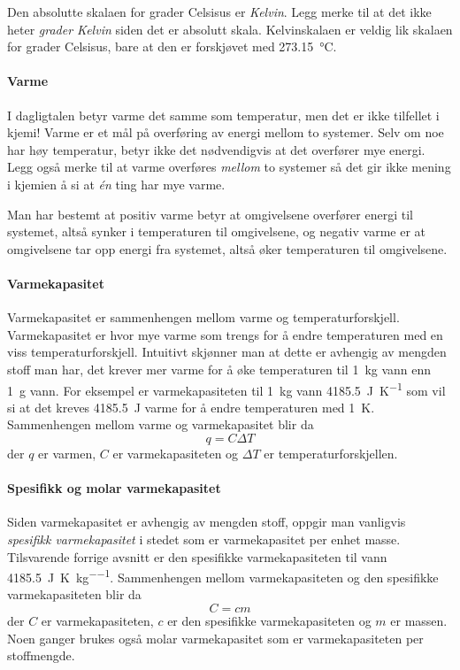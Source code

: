 	Den absolutte skalaen for grader Celsisus er \emph{Kelvin}.
	Legg merke til at det ikke heter \emph{grader Kelvin} siden det er absolutt skala.
	Kelvinskalaen er veldig lik skalaen for grader Celsisus, bare at den er forskjøvet med \SI{273.15}{\degreeCelsius}.
	
	\paragraph{Varme}
	I dagligtalen betyr varme det samme som temperatur, men det er ikke tilfellet i kjemi! Varme er et mål på overføring av energi mellom to systemer.
	Selv om noe har høy temperatur, betyr ikke det nødvendigvis at det overfører mye energi.
	Legg også merke til at varme overføres \emph{mellom} to systemer så det gir ikke mening i kjemien å si at \emph{én} ting har mye varme.
	
	Man har bestemt at positiv varme betyr at omgivelsene overfører energi til systemet, altså synker i temperaturen til omgivelsene, og negativ varme er at omgivelsene tar opp energi fra systemet, altså øker temperaturen til omgivelsene.
	
	\paragraph{Varmekapasitet}
	Varmekapasitet er sammenhengen mellom varme og temperaturforskjell.
	Varmekapasitet er hvor mye varme som trengs for å endre temperaturen med en viss temperaturforskjell.
	Intuitivt skjønner man at dette er avhengig av mengden stoff man har, det krever mer varme for å øke temperaturen til \SI{1}{\kilo\gram} vann enn \SI{1}{\gram} vann.
	For eksempel er varmekapasiteten til \SI{1}{\kilo\gram} vann \SI{4185.5}{\joule\per\kelvin} som vil si at det kreves \SI{4185.5}{\joule} varme for å endre temperaturen med \SI{1}{\kelvin}.
	Sammenhengen mellom varme og varmekapasitet blir da
	\begin{equation}
		q = C\Delta T \label{eq:heatcap}
	\end{equation}
	der $q$ er varmen, $C$ er varmekapasiteten og $\Delta T$ er temperaturforskjellen.
	
	\paragraph{Spesifikk og molar varmekapasitet}
	Siden varmekapasitet er avhengig av mengden stoff, oppgir man vanligvis \emph{spesifikk varmekapasitet} i stedet som er varmekapasitet per enhet masse.
	Tilsvarende forrige avsnitt er den spesifikke varmekapasiteten til vann \SI{4185.5}{\joule\per\kelvin\per\kilo\gram}.
	Sammenhengen mellom varmekapasiteten og den spesifikke varmekapasiteten blir da
	\begin{equation}
		C = cm \label{eq:specheatcap}
	\end{equation}
	der $C$ er varmekapasiteten, $c$ er den spesifikke varmekapasiteten og $m$ er massen.
	Noen ganger brukes også molar varmekapasitet som er varmekapasiteten per stoffmengde.
	
